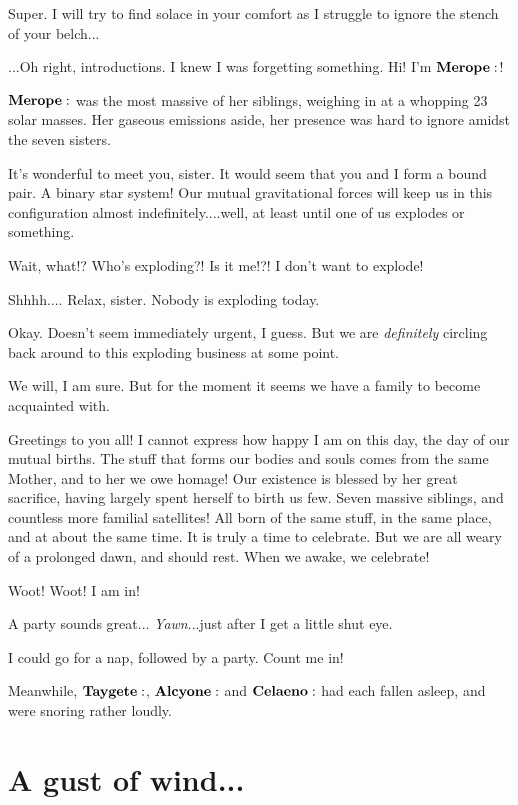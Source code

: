 \Sterope Super.  I will try to find solace in your comfort as I struggle to ignore the stench of your belch...

\Merope ...Oh right, introductions. I knew I was forgetting something.   Hi!  I'm $\Merope$!

$\Merope$ was the most massive of her siblings, weighing in at a whopping 23 solar masses.  Her gaseous emissions aside, her presence was hard to ignore amidst the seven sisters.  

\Maia It's wonderful to meet you, sister.  It would seem that you and I form a bound pair.  A binary star system!  Our mutual gravitational forces will keep us in this configuration almost indefinitely....well, at least until one of us explodes or something.

\Merope Wait, what!?  Who's exploding?!  Is it me!?!  I don't want to explode!

\Maia Shhhh....  Relax, sister.  Nobody is exploding today.  

\Merope Okay.  Doesn't seem immediately urgent, I guess. But we are \textit{definitely} circling back around to this exploding business at some point.

\Maia We will, I am sure.  But for the moment it seems we have a family to become acquainted with.

\Maia Greetings to you all!  I cannot express how happy I am on this day, the day of our mutual births.  The stuff that forms our bodies and souls comes from the same Mother, and to her we owe homage!  Our existence is blessed by her great sacrifice, having largely spent herself to birth us few.  Seven massive siblings, and countless more familial satellites!  All born of the same stuff, in the same place, and at about the same time.  It is truly a time to celebrate.  But we are all weary of a prolonged dawn, and should rest.  When we awake, we celebrate!

\Merope  Woot!  Woot!  I am in!  

\Electra A party sounds great... \textit{Yawn}...just after I get a little shut eye.

\Sterope I could go for a nap, followed by a party.  Count me in!

Meanwhile, $\Taygete$, $\Alcyone$ and $\Celaeno$ had each fallen asleep, and were snoring rather loudly.


\section{A gust of wind...}

